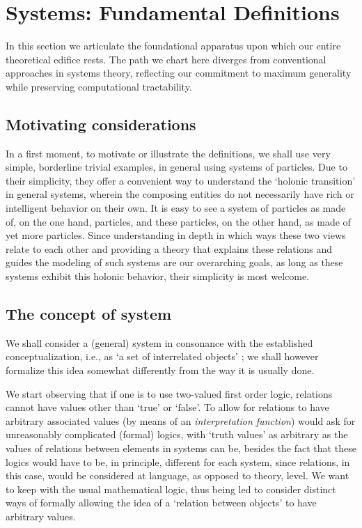 \section{Systems: Fundamental Definitions}

In this section we articulate the foundational apparatus upon which our entire theoretical edifice rests. The path we chart here diverges from conventional approaches in systems theory, reflecting our commitment to maximum generality while preserving computational tractability.

\subsection{Motivating considerations}

In a first moment, to motivate or illustrate the definitions, we shall use very simple, borderline trivial examples, in general using systems of particles. Due to their simplicity, they offer a convenient way to understand the `holonic transition' in general systems, wherein the composing entities do not necessarily have rich or intelligent behavior on their own. It is easy to see a system of particles as made of, on the one hand, particles, and these particles, on the other hand, as made of yet more particles. Since understanding in depth in which ways these two views relate to each other and providing a theory that explains these relations and guides the modeling of such systems are our overarching goals, as long as these systems exhibit this holonic behavior, their simplicity is most welcome. 

\subsection{The concept of system}

We shall consider a (general) system in consonance with the established conceptualization, i.e., as `a set of interrelated objects' \cite{Mesarovic1970}; we shall however formalize this idea somewhat differently from the way it is usually done.
 
We start observing that if one is to use two-valued first order logic, relations cannot have values other than `true' or `false'. To allow for relations to have arbitrary associated values (by means of an \textit{interpretation function}) would ask for unreasonably complicated (formal) logics, with `truth values' as arbitrary as the values of relations between elements in systems can be, besides the fact that these logics would have to be, in principle, different for each system, since relations, in this case, would be considered at language, as opposed to theory, level. We want to keep with the usual mathematical logic, thus being led to consider distinct ways of formally allowing the idea of a `relation between objects' to have arbitrary values. 

